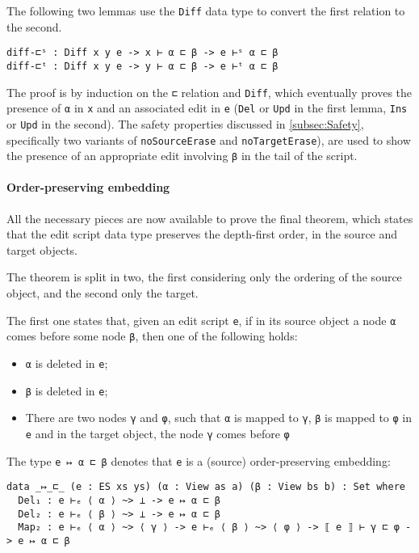 \documentclass[../Thesis.tex]{subfiles}
\begin{document}
	The following two lemmas use the \texttt{Diff} data type to convert
	the first relation to the second.	
\begin{verbatim}
diff-⊏ˢ : Diff x y e -> x ⊢ α ⊏ β -> e ⊢ˢ α ⊏ β
diff-⊏ᵗ : Diff x y e -> y ⊢ α ⊏ β -> e ⊢ᵗ α ⊏ β
\end{verbatim}
	The proof is by induction on the \texttt{⊏} relation and
	\texttt{Diff}, which eventually proves the presence of \texttt{α} in \texttt{x} 
	and an associated edit in \texttt{e} (\texttt{Del} or \texttt{Upd} in the first
	lemma, \texttt{Ins} or \texttt{Upd} in the second).
	The safety properties discussed in \ref{subsec:Safety}, specifically 
	two variants of \texttt{noSourceErase} and \texttt{noTargetErase}),
	are used to show the presence of an appropriate edit involving \texttt{β}
	in the tail of the script.
	
	\paragraph{Order-preserving embedding}
	All the necessary pieces are now available to prove the final theorem,
	which states that the edit script data type preserves the depth-first order,
	in the source and target objects.

	The theorem is split in two, the first considering only the ordering 
	of the source object, and the second only the target.
	
	The first one states that, given an edit script \texttt{e}, 
	if in its source object a node \texttt{α} comes before
	some node \texttt{β}, then one of the following holds:
\begin{itemize}
	\item \texttt{α} is deleted in \texttt{e};
	\item \texttt{β} is deleted in \texttt{e};
	\item There are two nodes \texttt{γ} and \texttt{φ}, such that \texttt{α} is 
	mapped to \texttt{γ}, \texttt{β} is mapped to \texttt{φ} in \texttt{e} and 
	in the target	object, the node \texttt{γ} comes before \texttt{φ}
\end{itemize}

	The type \texttt{e ↦ α ⊏ β} denotes that \texttt{e} is a (source) 
	order-preserving embedding:
\begin{verbatim}
data _↦_⊏_ (e : ES xs ys) (α : View as a) (β : View bs b) : Set where
  Del₁ : e ⊢ₑ ⟨ α ⟩ ~> ⊥ -> e ↦ α ⊏ β
  Del₂ : e ⊢ₑ ⟨ β ⟩ ~> ⊥ -> e ↦ α ⊏ β
  Map₂ : e ⊢ₑ ⟨ α ⟩ ~> ⟨ γ ⟩ -> e ⊢ₑ ⟨ β ⟩ ~> ⟨ φ ⟩ -> ⟦ e ⟧ ⊢ γ ⊏ φ -> e ↦ α ⊏ β
\end{verbatim}
\end{document}
